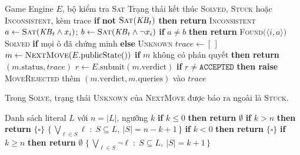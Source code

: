\begin{algorithm}[htbp]
  \caption{Vòng lặp của tác nhân suy luận}
  \label{alg:agent}
  \begin{algorithmic}[1]
    \Require Game Engine $E$, bộ kiểm tra \textsc{Sat}
    \Ensure Trạng thái kết thúc \textsc{Solved}, \textsc{Stuck} hoặc \textsc{Inconsistent}, kèm trace
      \State \textbf{if} \textbf{not} $\textsc{Sat}(\mathit{KB}_t)$ \textbf{then return} \textsc{Inconsistent}
        \State $a \gets \textsc{Sat}(\mathit{KB}_t \land x_i)$; \quad
               $b \gets \textsc{Sat}(\mathit{KB}_t \land \neg x_i)$
        \State \textbf{if} $a \ne b$ \textbf{then return} \textsc{Found}$\bigl(\langle i, a\rangle\bigr)$
      \EndFor
      \State \Return \textsc{Solved} \textbf{if} mọi ô đã chứng minh \textbf{else} \textsc{Unknown}
    \EndFunction
    \Statex
      \State $\mathit{trace} \gets [\,]$
      \Loop
        \State $m \gets \Call{NextMove}{E.\mathrm{publicState}()}$
        \State \textbf{if} $m$ không có phán quyết \textbf{then return} $(m.\mathrm{status}, \mathit{trace})$
        \State $r \gets E.\mathrm{submit}(m.\mathrm{verdict})$
        \State \textbf{if} $r \ne \texttt{ACCEPTED}$ \textbf{then raise} \textsc{MoveRejected}
        \State thêm $(m.\mathrm{verdict}, m.\mathrm{queries})$ vào $\mathit{trace}$
      \EndLoop
    \EndFunction
  \end{algorithmic}
\end{algorithm}

Trong \textsc{Solve}, trạng thái \textsc{Unknown} của \textsc{NextMove} được
báo ra ngoài là \textsc{Stuck}.

\begin{algorithm}[htbp]
  \caption{Mã hóa tổ hợp ràng buộc đếm}
  \label{alg:cardinality}
  \begin{algorithmic}[1]
    \Require Danh sách literal $L$ với $n = |L|$, ngưỡng $k$
      \State \textbf{if} $k \le 0$ \textbf{then return} $\emptyset$
      \State \textbf{if} $k > n$ \textbf{then return} $\{\square\}$
      \State \Return $\bigl\{\, \bigvee_{\ell \in S} \ell \;:\; S \subseteq L,\ |S| = n-k+1 \,\bigr\}$
    \EndFunction
    \Statex
      \State \textbf{if} $k < 0$ \textbf{then return} $\{\square\}$
      \State \textbf{if} $k \ge n$ \textbf{then return} $\emptyset$
      \State \Return $\bigl\{\, \bigvee_{\ell \in S} \neg\ell \;:\; S \subseteq L,\ |S| = k+1 \,\bigr\}$
    \EndFunction
  \end{algorithmic}
\end{algorithm}
